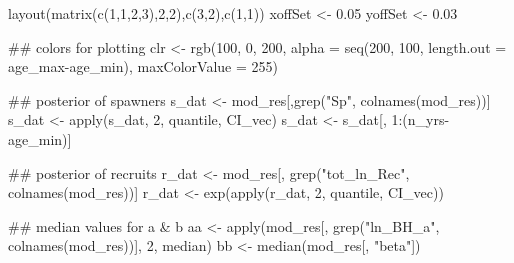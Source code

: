 \documentclass[
  11pt,
]{article}
\newenvironment{Shaded}{}{}
\newcommand{\AttributeTok}[1]{#1}
\newcommand{\DecValTok}[1]{#1}
\newcommand{\DocumentationTok}[1]{\textcolor[rgb]{0.00,0.50,0.00}{#1}}
\newcommand{\FloatTok}[1]{#1}
\newcommand{\FunctionTok}[1]{#1}
\newcommand{\NormalTok}[1]{#1}
\newcommand{\OtherTok}[1]{\textcolor[rgb]{1.00,0.25,0.00}{#1}}
\newcommand{\SpecialCharTok}[1]{\textcolor[rgb]{0.00,0.50,0.50}{#1}}
\newcommand{\StringTok}[1]{\textcolor[rgb]{0.00,0.50,0.50}{#1}}
\begin{document}
\begin{Shaded}
\begin{Highlighting}[]
\FunctionTok{layout}\NormalTok{(}\FunctionTok{matrix}\NormalTok{(}\FunctionTok{c}\NormalTok{(}\DecValTok{1}\NormalTok{,}\DecValTok{1}\NormalTok{,}\DecValTok{2}\NormalTok{,}\DecValTok{3}\NormalTok{),}\DecValTok{2}\NormalTok{,}\DecValTok{2}\NormalTok{),}\FunctionTok{c}\NormalTok{(}\DecValTok{3}\NormalTok{,}\DecValTok{2}\NormalTok{),}\FunctionTok{c}\NormalTok{(}\DecValTok{1}\NormalTok{,}\DecValTok{1}\NormalTok{))}
\NormalTok{xoffSet }\OtherTok{\textless{}{-}} \FloatTok{0.05}
\NormalTok{yoffSet }\OtherTok{\textless{}{-}} \FloatTok{0.03}

\DocumentationTok{\#\# colors for plotting}
\NormalTok{clr }\OtherTok{\textless{}{-}} \FunctionTok{rgb}\NormalTok{(}\DecValTok{100}\NormalTok{, }\DecValTok{0}\NormalTok{, }\DecValTok{200}\NormalTok{,}
           \AttributeTok{alpha =} \FunctionTok{seq}\NormalTok{(}\DecValTok{200}\NormalTok{, }\DecValTok{100}\NormalTok{,}
                       \AttributeTok{length.out =}\NormalTok{ age\_max}\SpecialCharTok{{-}}\NormalTok{age\_min),}
           \AttributeTok{maxColorValue =} \DecValTok{255}\NormalTok{)}

\DocumentationTok{\#\# posterior of spawners}
\NormalTok{s\_dat }\OtherTok{\textless{}{-}}\NormalTok{ mod\_res[,}\FunctionTok{grep}\NormalTok{(}\StringTok{"Sp"}\NormalTok{, }\FunctionTok{colnames}\NormalTok{(mod\_res))]}
\NormalTok{s\_dat }\OtherTok{\textless{}{-}} \FunctionTok{apply}\NormalTok{(s\_dat, }\DecValTok{2}\NormalTok{, quantile, CI\_vec)}
\NormalTok{s\_dat }\OtherTok{\textless{}{-}}\NormalTok{ s\_dat[, }\DecValTok{1}\SpecialCharTok{:}\NormalTok{(n\_yrs}\SpecialCharTok{{-}}\NormalTok{age\_min)]}

\DocumentationTok{\#\# posterior of recruits}
\NormalTok{r\_dat }\OtherTok{\textless{}{-}}\NormalTok{ mod\_res[, }\FunctionTok{grep}\NormalTok{(}\StringTok{"tot\_ln\_Rec"}\NormalTok{, }\FunctionTok{colnames}\NormalTok{(mod\_res))]}
\NormalTok{r\_dat }\OtherTok{\textless{}{-}} \FunctionTok{exp}\NormalTok{(}\FunctionTok{apply}\NormalTok{(r\_dat, }\DecValTok{2}\NormalTok{, quantile, CI\_vec))}

\DocumentationTok{\#\# median values for a \& b}
\NormalTok{aa }\OtherTok{\textless{}{-}} \FunctionTok{apply}\NormalTok{(mod\_res[, }\FunctionTok{grep}\NormalTok{(}\StringTok{"ln\_BH\_a"}\NormalTok{, }\FunctionTok{colnames}\NormalTok{(mod\_res))], }\DecValTok{2}\NormalTok{, median)}
\NormalTok{bb }\OtherTok{\textless{}{-}} \FunctionTok{median}\NormalTok{(mod\_res[, }\StringTok{"beta"}\NormalTok{])}


\end{Highlighting}
\end{Shaded}
\end{document}

